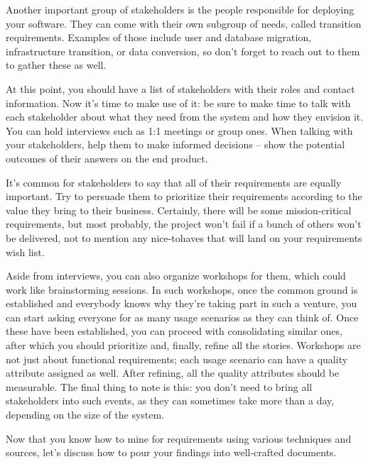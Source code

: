 Another important group of stakeholders is the people responsible for deploying your software. They can come with their own subgroup of needs, called transition requirements. Examples of those include user and database migration, infrastructure transition, or data conversion, so don't forget to reach out to them to gather these as well.



At this point, you should have a list of stakeholders with their roles and contact information. Now it's time to make use of it: be sure to make time to talk with each stakeholder about what they need from the system and how they envision it. You can hold interviews such as 1:1 meetings or group ones. When talking with your stakeholders, help them to make informed decisions – show the potential outcomes of their answers on the end product.

It's common for stakeholders to say that all of their requirements are equally important. Try to persuade them to prioritize their requirements according to the value they bring to their business. Certainly, there will be some mission-critical requirements, but most probably, the project won't fail if a bunch of others won't be delivered, not to mention any nice-tohaves that will land on your requirements wish list.

Aside from interviews, you can also organize workshops for them, which could work like brainstorming sessions. In such workshops, once the common ground is established and everybody knows why they're taking part in such a venture, you can start asking everyone for as many usage scenarios as they can think of. Once these have been established, you can proceed with consolidating similar ones, after which you should prioritize and, finally, refine all the stories. Workshops are not just about functional requirements; each usage scenario can have a quality attribute assigned as well. After refining, all the quality attributes should be measurable. The final thing to note is this: you don't need to bring all stakeholders into such events, as they can sometimes take more than a day, depending on the size of the system.

Now that you know how to mine for requirements using various techniques and sources, let's discuss how to pour your findings into well-crafted documents.







